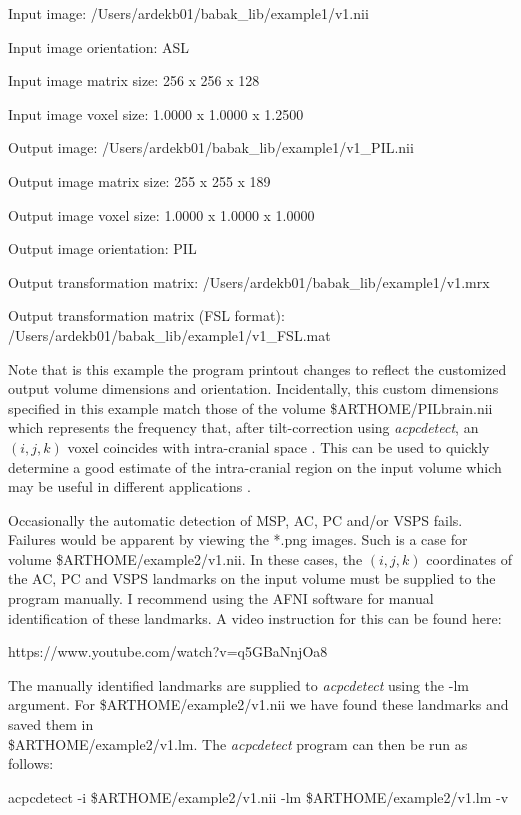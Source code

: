 \documentclass[11pt]{article}
\begin{document}
Input image: /Users/ardekb01/babak\_lib/example1/v1.nii

Input image orientation: ASL

Input image matrix size: 256 x 256 x 128

Input image voxel size: 1.0000 x 1.0000 x 1.2500

Output image: /Users/ardekb01/babak\_lib/example1/v1\_PIL.nii

Output image matrix size: 255 x 255 x 189 

Output image voxel size: 1.0000 x 1.0000 x 1.0000

Output image orientation: PIL

Output transformation matrix: /Users/ardekb01/babak\_lib/example1/v1.mrx

Output transformation matrix (FSL format): /Users/ardekb01/babak\_lib/example1/v1\_FSL.mat 

\noindent Note that is this example the program printout changes to reflect the customized output volume dimensions
and orientation.  Incidentally, this custom dimensions specified in this example match those of
the volume \$ARTHOME/PILbrain.nii which represents the frequency that, after tilt-correction using
{\it acpcdetect}, an $(i,j,k)$ voxel coincides with intra-cranial space \citep{ardekani2018}. 
This can be used to quickly determine a good estimate of the intra-cranial region on the input volume
which may be useful in different applications \citep{ardekani2018}.
\vspace{3mm}

 Occasionally the automatic detection of MSP, AC, PC and/or VSPS
fails. Failures would be apparent by viewing the *.png images.
Such is a case for volume \$ARTHOME/example2/v1.nii.  In these cases, the $(i,j,k)$ coordinates
of the AC, PC and VSPS landmarks on the input volume must be supplied to the program manually.  I recommend
using the AFNI software for manual identification of these landmarks. A video instruction for this 
can be found here: 

https://www.youtube.com/watch?v=q5GBaNnjOa8 

\noindent The manually identified landmarks are supplied to {\it acpcdetect} using the -lm argument.  For 
\$ARTHOME/example2/v1.nii we have found these landmarks and saved them in \\
\$ARTHOME/example2/v1.lm.  The {\it acpcdetect} program can then be run as follows:

acpcdetect -i \$ARTHOME/example2/v1.nii -lm \$ARTHOME/example2/v1.lm -v
\end{document}
